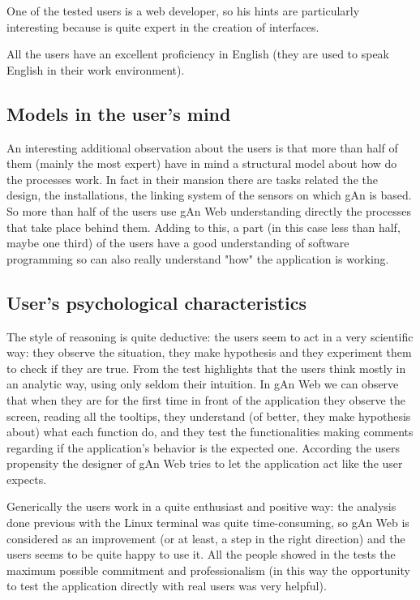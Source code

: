 One of the tested users is a web developer, so his hints are particularly interesting because is quite expert in the creation of interfaces.
 
All the users have an excellent proficiency in English (they are used to speak English in their work environment). 

\subsection{Models in the user's mind}
An interesting additional observation about the users is that more than half of them (mainly the most expert) have in mind a structural model about how do the processes work. In fact in their mansion there are tasks related the the design, the installations, the linking system of the sensors on which gAn is based. So more than half of the users use gAn Web understanding directly the processes that take place behind them. Adding to this, a part (in this case less than half, maybe one third) of the users have a good understanding of software programming so can also really understand "how" the application is working.

\subsection{User's psychological characteristics }
The style of reasoning is quite deductive: the users seem to act in a very scientific way: they observe the situation, they make hypothesis and they experiment them to check if they are true. From the test highlights that the users think mostly in an analytic way, using only seldom their intuition. In gAn Web we can observe that when they are for the first time in front of the application they observe the screen, reading all the tooltips, they understand (of better, they make hypothesis about) what each function do, and they test the functionalities making comments regarding if the application's behavior is the expected one. According the users propensity the designer of gAn Web tries to let the application act like the user expects.   

Generically the users work in a quite enthusiast and positive way: the analysis done previous with the Linux terminal was quite time-consuming, so gAn Web is considered as an improvement (or at least, a step in the right direction) and the users seems to be quite happy to use it. All the people showed in the tests the maximum possible commitment and professionalism (in this way the opportunity to test the application directly with real users was very helpful).

